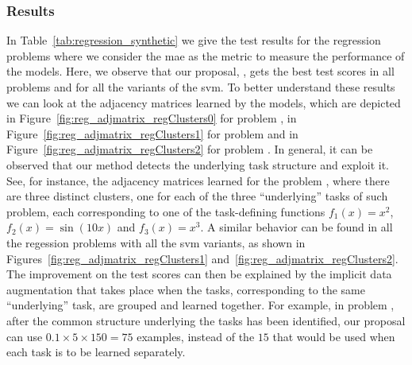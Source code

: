 \subsubsection*{Results}
%
In Table~\ref{tab:regression_synthetic} we give the test results for the regression problems where we consider the \acrshort{mae} as the metric to measure the performance of the models.
%
Here, we observe that our proposal, , gets the best test scores in all problems and for all the variants of the \acrshort{svm}.
To better understand these results we can look at the adjacency matrices learned by the  models, which are depicted in Figure~\ref{fig:reg_adjmatrix_regClusters0} for problem , in Figure~\ref{fig:reg_adjmatrix_regClusters1} for problem  and in Figure~\ref{fig:reg_adjmatrix_regClusters2} for problem .
%
In general, it can be observed that our method detects the underlying task structure and exploit it.
See, for instance, the adjacency matrices learned for the problem , where there are three distinct clusters, one for each of the three ``underlying'' tasks of such problem, each corresponding to one of the task-defining functions $f_1(x) = x^2$,  $f_2(x) = \sin(10x)$ and $f_3(x) = x^3$.
%
A similar behavior can be found in all the regession problems with all the \acrshort{svm} variants, as shown in Figures~\ref{fig:reg_adjmatrix_regClusters1} and~\ref{fig:reg_adjmatrix_regClusters2}.
%
The improvement on the test scores can then be explained by the implicit data augmentation that takes place when the tasks, corresponding to the same ``underlying'' task, are grouped and learned together.
%
For example, in problem , after the common structure underlying the tasks has been identified, our proposal can use $0.1 \times 5 \times 150 = 75$ examples, instead of the $15$ that would be used when each task is to be learned separately.
%

